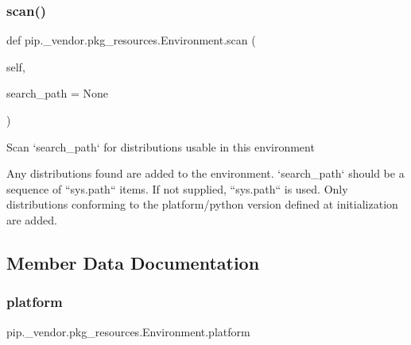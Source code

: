 \subsubsection{\texorpdfstring{scan()}{scan()}}
{\footnotesize\ttfamily def pip.\+\_\+vendor.\+pkg\+\_\+resources.\+Environment.\+scan (\begin{DoxyParamCaption}\item[{}]{self,  }\item[{}]{search\+\_\+path = {\ttfamily None} }\end{DoxyParamCaption})}

\begin{DoxyVerb}Scan `search_path` for distributions usable in this environment

Any distributions found are added to the environment.
`search_path` should be a sequence of ``sys.path`` items.  If not
supplied, ``sys.path`` is used.  Only distributions conforming to
the platform/python version defined at initialization are added.
\end{DoxyVerb}
 

\subsection{Member Data Documentation}
\mbox{\label{classpip_1_1__vendor_1_1pkg__resources_1_1Environment_a02c2c80bef7eff5fdc3f4b6de4602852}} 
\subsubsection{\texorpdfstring{platform}{platform}}
{\footnotesize\ttfamily pip.\+\_\+vendor.\+pkg\+\_\+resources.\+Environment.\+platform}

\mbox{\label{classpip_1_1__vendor_1_1pkg__resources_1_1Environment_a67849e2d8c8b3e2361254c87ccc96855}} 
